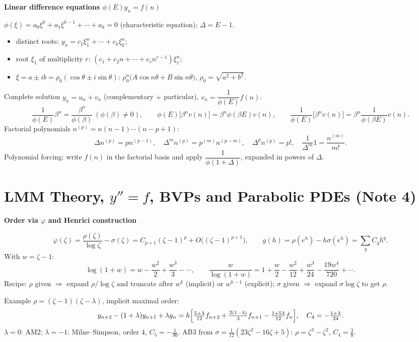 \documentclass[10pt,a4paper]{article}
\newcommand{\head}[1]{\par\smallskip\noindent\textbf{\color{blue!50!black}#1}\par\nobreak}
\begin{document}
\head{Linear difference equations \(\phi(E)y_n=f(n)\)}
\(\phi(\xi)=a_0\xi^k+a_1\xi^{k-1}+\cdots+a_k=0\) (characteristic equation);
\(\Delta=E-1\).
\begin{itemize}
  \item distinct roots: \(y_n=c_1\xi_1^n+\cdots+c_k\xi_k^n\);
  \item root \(\xi_1\) of multiplicity \(r\): \((c_1+c_2n+\cdots+c_rn^{r-1})\xi_1^n\);
  \item \(\xi=a\pm ib=\rho_0(\cos\theta\pm i\sin\theta)\):
    \(\rho_0^n\bigl(A\cos n\theta+B\sin n\theta\bigr)\), \(\rho_0=\sqrt{a^2+b^2}\).
\end{itemize}
Complete solution \(y_n=u_n+v_n\) (complementary \(+\) particular),
\(v_n=\dfrac1{\phi(E)}f(n)\).
\[
  \frac1{\phi(E)}\beta^n=\frac{\beta^n}{\phi(\beta)}\ (\phi(\beta)\ne0),
  \qquad
  \phi(E)\bigl[\beta^nv(n)\bigr]=\beta^n\phi(\beta E)v(n),
  \qquad
  \frac1{\phi(E)}\bigl[\beta^nv(n)\bigr]=\beta^n\frac1{\phi(\beta E)}v(n).
\]
Factorial polynomials \(n^{(p)}=n(n-1)\cdots(n-p+1)\):
\[
  \Delta n^{(p)}=pn^{(p-1)},\quad
  \Delta^mn^{(p)}=p^{(m)}n^{(p-m)},\quad
  \Delta^pn^{(p)}=p!,\quad
  \frac1{\Delta^m}1=\frac{n^{(m)}}{m!}.
\]
Polynomial forcing: write \(f(n)\) in the factorial basis and apply
\(\dfrac1{\phi(1+\Delta)}\), expanded in powers of \(\Delta\).

\section{LMM Theory, \(y''=f\), BVPs and Parabolic PDEs (Note 4)}

\head{Order via \(\varphi\) and Henrici construction}
\[
  \varphi(\zeta)=\frac{\rho(\zeta)}{\log\zeta}-\sigma(\zeta)
  =C_{p+1}(\zeta-1)^p+O\bigl((\zeta-1)^{p+1}\bigr),
  \qquad
  g(h)=\rho(e^h)-h\sigma(e^h)=\sum_qC_qh^q .
\]
With \(w=\zeta-1\):
\[
  \log(1+w)=w-\frac{w^2}2+\frac{w^3}3-\cdots,
  \qquad
  \frac w{\log(1+w)}=1+\frac w2-\frac{w^2}{12}+\frac{w^3}{24}-\frac{19w^4}{720}+\cdots.
\]
Recipe: \(\rho\) given \(\Rightarrow\) expand \(\rho/\log\zeta\) and truncate after
\(w^k\) (implicit) or \(w^{k-1}\) (explicit); \(\sigma\) given \(\Rightarrow\) expand
\(\sigma\log\zeta\) to get \(\rho\).

Example \(\rho=(\zeta-1)(\zeta-\lambda)\), implicit maximal order:
\[
  y_{n+2}-(1+\lambda)y_{n+1}+\lambda y_n
  =h\Bigl[\tfrac{5+\lambda}{12}f_{n+2}+\tfrac{2(1-\lambda)}3f_{n+1}-\tfrac{1+5\lambda}{12}f_n\Bigr],
  \quad C_4=-\tfrac{1+\lambda}{24}.
\]
\(\lambda=0\): AM2; \(\lambda=-1\): Milne--Simpson, order \(4\), \(C_5=-\frac1{90}\).
AB3 from \(\sigma=\frac1{12}(23\zeta^2-16\zeta+5)\): \(\rho=\zeta^3-\zeta^2\), \(C_4=\frac38\).
\end{document}

